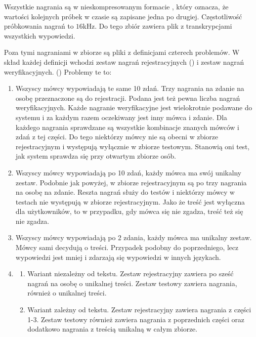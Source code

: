 Wszystkie nagrania są w nieskompresowanym formacie , który oznacza, że wartości kolejnych próbek w czasie
są zapisane jedna po drugiej. Częstotliwość próbkowania nagrań to $16$kHz. Do tego zbiór zawiera plik z transkrypcjami
wszystkich wypowiedzi.

Poza tymi nagraniami w zbiorze są pliki z definicjami czterech problemów. W skład każdej definicji wchodzi zestaw nagrań
rejestracyjnych () i zestaw nagrań weryfikacyjnych. () Problemy te to:
\begin{enumerate}
    \item Wszyscy mówcy wypowiadają te same 10 zdań. Trzy nagrania na zdanie na osobę przeznaczone są do rejestracji. Podana
        jest też pewna liczba nagrań weryfikacyjnych. Każde nagranie weryfikacyjne jest wielokrotnie podawane do systemu
        i za każdym razem oczekiwany jest inny mówca i zdanie. Dla każdego nagrania sprawdzane są wszystkie
        kombinacje znanych mówców i zdań z tej części. Do tego niektórzy
        mówcy nie są obecni w zbiorze rejestracyjnym i występują wyłącznie w zbiorze testowym. Stanowią oni test, jak system
        sprawdza się przy otwartym zbiorze osób.
    \item Wszyscy mówcy wypowiadają po 10 zdań, każdy mówca ma swój unikalny zestaw. Podobnie jak powyżej, w zbiorze
        rejestracyjnym są po trzy nagrania na osobę na zdanie. Reszta nagrań służy do testów i niektórzy
        mówcy w testach nie występują w zbiorze rejestracyjnym.
        Jako że treść jest wyłączna dla użytkowników, to w przypadku, gdy mówca się nie zgadza, treść też się nie zgadza.
    \item Wszyscy mówcy wypowiadają po 2 zdania, każdy mówca ma unikalny zestaw. Mówcy sami decydują o treści.
        Przypadek podobny do poprzedniego, lecz wypowiedzi jest mniej i zdarzają się wypowiedzi w innych językach.
    \item
        \begin{enumerate}
            \item Wariant niezależny od tekstu. Zestaw rejestracyjny zawiera po sześć nagrań na osobę o unikalnej treści.
                Zestaw testowy zawiera nagrania, również o unikalnej treści.
            \item Wariant zależny od tekstu. Zestaw rejestracyjny zawiera nagrania z części 1-3. Zestaw testowy również
                zawiera nagrania z poprzednich części oraz dodatkowo nagrania z treścią unikalną w całym zbiorze.
        \end{enumerate}
\end{enumerate}

